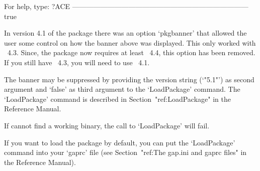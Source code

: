                  For help, type: ?ACE
---------------------------------------------------------------------------
true
\endexample

In version 4.1 of the {\ACE} package there was an  option  `pkgbanner'
that allowed the user  some  control  on  how  the  banner  above  was
displayed. This only worked with {\GAP}~4.3. Since, the {\ACE} package
now requires at least {\GAP}~4.4, this option has been removed. If you
still have {\GAP}~4.3, you will need to use {\ACE}~4.1.

The banner may be suppressed by providing the version string (`"5.1"')
as second argument and `false' as third argument to the  `LoadPackage'
command.    The    `LoadPackage'    command    is     described     in
Section~"ref:LoadPackage" in the {\GAP} Reference Manual.

If {\GAP} cannot find a working binary, the call to `LoadPackage' will
fail.

If you want to load the {\ACE} package by default,  you  can  put  the
`LoadPackage' command into your `gaprc'  file  (see
Section~"ref:The gap.ini and gaprc files" in the {\GAP} Reference Manual).

